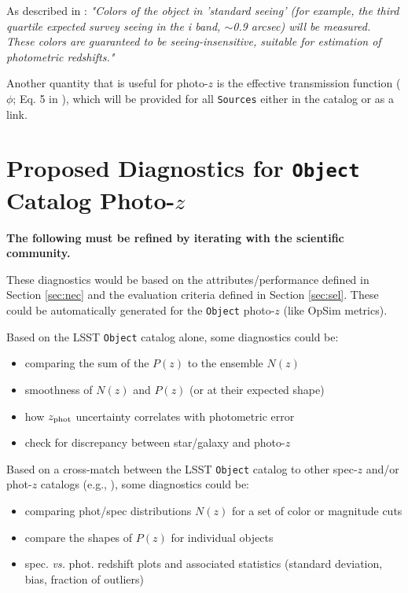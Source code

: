 \documentclass[DM,lsstdraft,toc]{lsstdoc}
\begin{document}
As described in : {\it "Colors of the object in 'standard seeing' (for example, the third quartile expected survey seeing in the i band, $\sim$0.9 arcsec) will be measured. These colors are guaranteed to be seeing-insensitive, suitable for estimation of photometric redshifts."}

Another quantity that is useful for photo-$z$ is the effective transmission function ($\phi$; Eq. 5 in ), which will be provided for all {\tt Sources} either in the catalog or as a link.


\section{Proposed Diagnostics for {\tt Object} Catalog Photo-$z$} \label{sec:diagnostics}

{\bf The following must be refined by iterating with the scientific community.}

These diagnostics would be based on the attributes/performance defined in Section \ref{sec:nec} and the evaluation criteria defined in Section \ref{sec:sel}. These could be automatically generated for the {\tt Object} photo-$z$ (like OpSim metrics).

Based on the LSST {\tt Object} catalog alone, some diagnostics could be:
\begin{itemize}[noitemsep,topsep=-10pt]
\item comparing the sum of the $P(z)$ to the ensemble $N(z)$
\item smoothness of $N(z)$ and $P(z)$ (or at their expected shape)
\item how $z_{\rm phot}$ uncertainty correlates with photometric error
\item check for discrepancy between star/galaxy and photo-$z$
\end{itemize}

Based on a cross-match between the LSST {\tt Object} catalog to other spec-$z$ and/or phot-$z$ catalogs (e.g., \citealt{2019MNRAS.488.4565Z}), some diagnostics could be:
\begin{itemize}[noitemsep,topsep=-10pt]
\item comparing phot/spec distributions $N(z)$ for a set of color or magnitude cuts
\item compare the shapes of $P(z)$ for individual objects
\item spec. {\it vs.} phot. redshift plots and associated statistics (standard deviation, bias, fraction of outliers)
\end{itemize}
\end{document}
